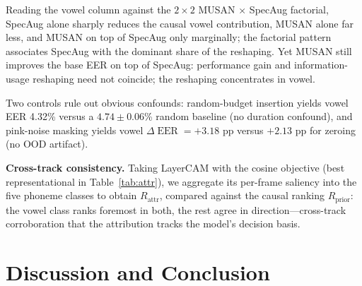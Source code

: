 \documentclass{article}
\DeclareMathOperator{\EER}{EER}
\newcommand{\dEER}{\Delta\EER}
\begin{document}


Reading the vowel column against the $2\times2$ MUSAN $\times$ SpecAug factorial, SpecAug alone sharply reduces the causal vowel contribution, MUSAN alone far less, and MUSAN on top of SpecAug only marginally; the factorial pattern associates SpecAug with the dominant share of the reshaping. Yet MUSAN still improves the base EER on top of SpecAug: performance gain and information-usage reshaping need not coincide; the reshaping concentrates in vowel.

Two controls rule out obvious confounds: random-budget insertion yields vowel EER 4.32\% versus a $4.74\pm0.06$\% random baseline (no duration confound), and pink-noise masking yields vowel $\dEER = +3.18$ pp versus $+2.13$ pp for zeroing (no OOD artifact).

\textbf{Cross-track consistency.} Taking LayerCAM with the cosine objective (best representational in Table~\ref{tab:attr}), we aggregate its per-frame saliency into the five phoneme classes to obtain $R_{\text{attr}}$, compared against the causal ranking $R_{\text{prior}}$: the vowel class ranks foremost in both, the rest agree in direction---cross-track corroboration that the attribution tracks the model's decision basis.

\section{Discussion and Conclusion}
\label{sec:disc}
\end{document}
